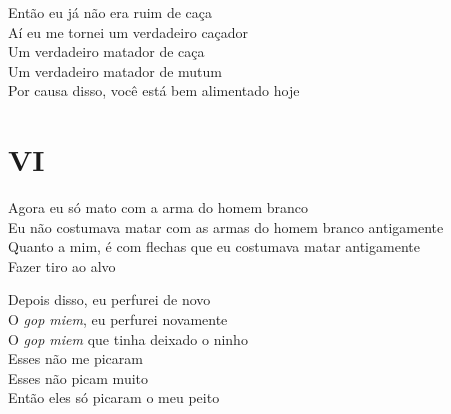 \begin{linenumbers}\begingroup\raggedright
 
\noindent   Então eu já não era ruim de caça\\
  Aí eu me tornei um verdadeiro caçador\\
  Um verdadeiro matador de caça\\
  Um verdadeiro matador de mutum\\
  Por causa disso, você está bem alimentado hoje
 
 
\medskip
\section{VI}

  \noindent Agora eu só mato com a arma do homem branco\\
  Eu não costumava matar com as armas do homem branco antigamente\\
  Quanto a mim, é com flechas que eu costumava matar antigamente\\
  Fazer tiro ao alvo
 
\end{linenumbers}\endgroup

\bigskip

\begin{linenumbers}\begingroup\raggedright
 
\noindent   Depois disso, eu perfurei de novo\\
  O \textit{gop miem}, eu perfurei novamente\\
  O \textit{gop miem} que tinha deixado o ninho\\
  Esses não me picaram\\
  Esses não picam muito\\
  Então eles só picaram o meu peito
 
\end{linenumbers}\endgroup

